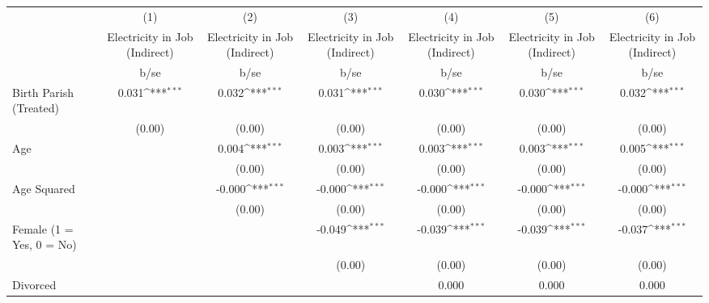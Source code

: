 {
\def\sym#1{\ifmmode^{#1}\else\(^{#1}\)\fi}
\begin{tabular}{l*{6}{c}}
\hline\hline
                    &\multicolumn{1}{c}{(1)}&\multicolumn{1}{c}{(2)}&\multicolumn{1}{c}{(3)}&\multicolumn{1}{c}{(4)}&\multicolumn{1}{c}{(5)}&\multicolumn{1}{c}{(6)}\\
                    &\multicolumn{1}{c}{Electricity in Job (Indirect)}&\multicolumn{1}{c}{Electricity in Job (Indirect)}&\multicolumn{1}{c}{Electricity in Job (Indirect)}&\multicolumn{1}{c}{Electricity in Job (Indirect)}&\multicolumn{1}{c}{Electricity in Job (Indirect)}&\multicolumn{1}{c}{Electricity in Job (Indirect)}\\
                    &        b/se         &        b/se         &        b/se         &        b/se         &        b/se         &        b/se         \\
\hline
Birth Parish (Treated)&       0.031\sym{***}&       0.032\sym{***}&       0.031\sym{***}&       0.030\sym{***}&       0.030\sym{***}&       0.032\sym{***}\\
                    &      (0.00)         &      (0.00)         &      (0.00)         &      (0.00)         &      (0.00)         &      (0.00)         \\
Age                 &                     &       0.004\sym{***}&       0.003\sym{***}&       0.003\sym{***}&       0.003\sym{***}&       0.005\sym{***}\\
                    &                     &      (0.00)         &      (0.00)         &      (0.00)         &      (0.00)         &      (0.00)         \\
Age Squared         &                     &      -0.000\sym{***}&      -0.000\sym{***}&      -0.000\sym{***}&      -0.000\sym{***}&      -0.000\sym{***}\\
                    &                     &      (0.00)         &      (0.00)         &      (0.00)         &      (0.00)         &      (0.00)         \\
Female (1 = Yes, 0 = No)&                     &                     &      -0.049\sym{***}&      -0.039\sym{***}&      -0.039\sym{***}&      -0.037\sym{***}\\
                    &                     &                     &      (0.00)         &      (0.00)         &      (0.00)         &      (0.00)         \\
Divorced            &                     &                     &                     &       0.000         &       0.000         &       0.000         \\

\end{tabular}}
